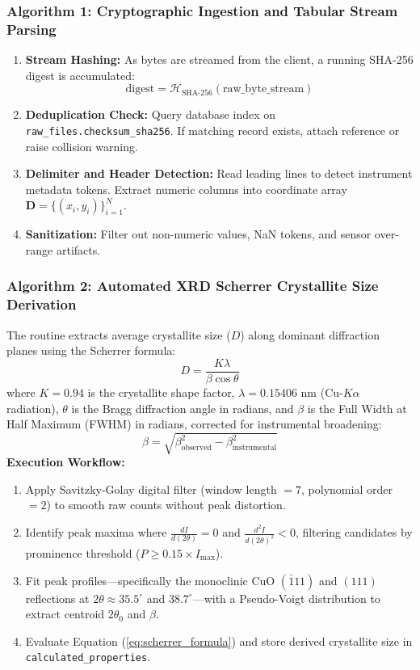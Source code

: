 \documentclass[12pt,a4paper,oneside]{report}
\begin{document}
{{{\subsubsection{Algorithm 1: Cryptographic Ingestion and Tabular Stream Parsing}
\begin{enumerate}
    \item \textbf{Stream Hashing:} As bytes are streamed from the client, a running SHA-256 digest is accumulated:
    \begin{equation}
        \text{digest} = \mathcal{H}_{\text{SHA-256}}(\text{raw\_byte\_stream})
    \end{equation}
    \item \textbf{Deduplication Check:} Query database index on \texttt{raw\_files.checksum\_sha256}. If matching record exists, attach reference or raise collision warning.
    \item \textbf{Delimiter and Header Detection:} Read leading lines to detect instrument metadata tokens. Extract numeric columns into coordinate array $\mathbf{D} = \{(x_i, y_i)\}_{i=1}^N$.
    \item \textbf{Sanitization:} Filter out non-numeric values, NaN tokens, and sensor over-range artifacts.
\end{enumerate}

\subsubsection{Algorithm 2: Automated XRD Scherrer Crystallite Size Derivation}
The routine extracts average crystallite size ($D$) along dominant diffraction planes using the Scherrer formula:
\begin{equation}
    D = \frac{K \lambda}{\beta \cos\theta}
    \label{eq:scherrer_formula}
\end{equation}
where $K = 0.94$ is the crystallite shape factor, $\lambda = 0.15406\text{ nm}$ ($\text{Cu-}K\alpha$ radiation), $\theta$ is the Bragg diffraction angle in radians, and $\beta$ is the Full Width at Half Maximum (FWHM) in radians, corrected for instrumental broadening:
\begin{equation}
    \beta = \sqrt{\beta_{\text{observed}}^2 - \beta_{\text{instrumental}}^2}
\end{equation}
\noindent\textbf{Execution Workflow:}
\begin{enumerate}
    \item Apply Savitzky-Golay digital filter (window length $= 7$, polynomial order $= 2$) to smooth raw counts without peak distortion.
    \item Identify peak maxima where $\frac{dI}{d(2\theta)} = 0$ and $\frac{d^2I}{d(2\theta)^2} < 0$, filtering candidates by prominence threshold ($P \ge 0.15 \times I_{\max}$).
    \item Fit peak profiles—specifically the monoclinic $\text{CuO}$ $(\bar{1}11)$ and $(111)$ reflections at $2\theta \approx 35.5^\circ$ and $38.7^\circ$—with a Pseudo-Voigt distribution to extract centroid $2\theta_0$ and $\beta$.
    \item Evaluate Equation (\ref{eq:scherrer_formula}) and store derived crystallite size in \texttt{calculated\_properties}.
\end{enumerate}

}}}
\end{document}
